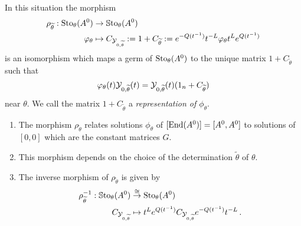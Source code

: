 \begin{prop}\label{prop:representation}
  In this situation the morphism
  \begin{align*}
    \rho_{\widetilde\theta}:\operatorname{Sto}_\theta(A^0)&\to\operatorname{\mathbb{S}to}_\theta(A^0)
    \\\varphi_\theta
    &\mapsto
    C_{\mathcal{Y}_{0,\widetilde\theta}}
    :=1+C_{\widetilde\theta}
    :=e^{-Q(t^{-1})}t^{-L} \varphi_\theta t^L e^{Q(t^{-1})}
  \end{align*}
  is an isomorphism which maps a germ of $\operatorname{Sto}_\theta(A^0)$ to the unique
  matrix $1+C_{\tilde\theta}$ such that
  \begin{equation} \label{eq:representation}
    \varphi_\theta(t)\mathcal{Y}_{0,\widetilde\theta}(t)
    =\mathcal{Y}_{0,\widetilde\theta}(t)(1_n+C_{\widetilde\theta})
  \end{equation}
  near $\theta$.  We call the matrix $1+C_{\tilde\theta}$ a
  \emph{representation of $\phi_\theta$}.
  \begin{s-rem}
    \begin{enumerate}
      \item {}
        The morphism $\rho_{\tilde\theta}$ relates solutions $\phi_\theta$ of
        $[\operatorname{End}(A^0)]=[A^0,A^0]$ to solutions of $[0,0]$ which are the constant
        matrices $G$.
      \item This morphism depends on the choice of the determination
        $\tilde\theta$ of $\theta$.
      \item The inverse morphism of $\rho_{\tilde\theta}$ is given by
        \begin{align*}
          \rho_{\widetilde\theta}^{-1}:
          \operatorname{\mathbb{S}to}_\theta(A^0)
          &\overset{\cong}\to
          \operatorname{Sto}_\theta(A^0)
          \\C_{\mathcal{Y}_{0,\widetilde\theta}} &\mapsto
          t^{L}e^{Q(t^{-1})}C_{\mathcal{Y}_{0,\widetilde\theta}} e^{-Q(t^{-1})}t^{-L} \,.
        \end{align*}
    \end{enumerate}
  \end{s-rem}
\end{prop}
